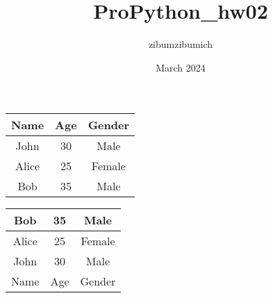 \documentclass{article}
\title{ProPython_hw02}
\author{zibumzibumich }
\date{March 2024}
\begin{document}
\maketitle
\begin{tabular}{|c|c|c|}
\hline
Name & Age & Gender \\
\hline
John & 30 & Male \\
\hline
Alice & 25 & Female \\
\hline
Bob & 35 & Male \\
\hline\end{tabular}

\begin{tabular}{|c|c|c|}
\hline
Bob & 35 & Male \\
\hline
Alice & 25 & Female \\
\hline
John & 30 & Male \\
\hline
Name & Age & Gender \\
\hline\end{tabular}
\end{document}
